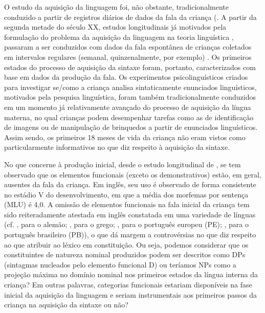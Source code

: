 \documentclass[output=paper]{LSP/langsci}
\begin{document}
O estudo da aquisição da linguagem foi, não obstante, tradicionalmente conduzido a partir de registros diários de dados da fala da criança (\citep{sternstern1907,leopold1949}. A partir da segunda metade do século XX, estudos longitudinais já motivados pela formulação do problema da aquisição da linguagem na teoria linguística \citep{chomsky1965}, passaram a ser conduzidos com dados da fala espontânea de crianças coletados em intervalos regulares (semanal, quinzenalmente, por exemplo) \citep{braine1963,mcneill1966,brown1973}. Os primeiros estados do processo de aquisição da sintaxe foram, portanto, caracterizados com base em dados da produção da fala. Os experimentos psicolinguísticos criados para investigar se/como a criança analisa sintaticamente enunciados linguísticos, motivados pela pesquisa linguística, foram também tradicionalmente conduzidos em um momento já relativamente avançado do processo de aquisição da língua materna, no qual crianças podem desempenhar tarefas como as de identificação de imagens ou de manipulação de brinquedos a partir de enunciados linguísticos. Assim sendo, os primeiros 18 meses de vida da criança não eram vistos como particularmente informativos no que diz respeito à aquisição da sintaxe. 

No que concerne à produção inicial, desde o estudo longitudinal de \citet{brown1973}, se tem observado que os elementos funcionais (exceto os demonstrativos) estão, em geral, ausentes da fala da criança. Em inglês, seu uso é observado de forma consistente no estádio V do desenvolvimento, em que a média dos morfemas por sentença (MLU) é 4,0. A omissão de elementos funcionais na fala inicial da criança tem sido reiteradamente atestada em inglês \citep{bloom1993} constatada em uma variedade de línguas (cf. \citealt{clahsen1990}, para o alemão; \citealt{marinis2000}, para o grego; \citealt{faria1993}, para o português europeu (PE); \citealt{lopes2003}, para o português brasileiro (PB)), o que dá margem a controvérsias no que diz respeito ao que atribuir ao léxico em constituição. Ou seja, podemos considerar que os constituintes de natureza nominal produzidos podem ser descritos como DPs (sintagmas nucleados pelo elemento funcional D) ou teríamos NPs como a projeção máxima no domínio nominal nos primeiros estados da língua interna da criança? Em outras palavras, categorias funcionais estariam disponíveis na fase inicial da aquisição da linguagem e seriam instrumentais aos primeiros passos da criança na aquisição da sintaxe ou não?
\end{document}
